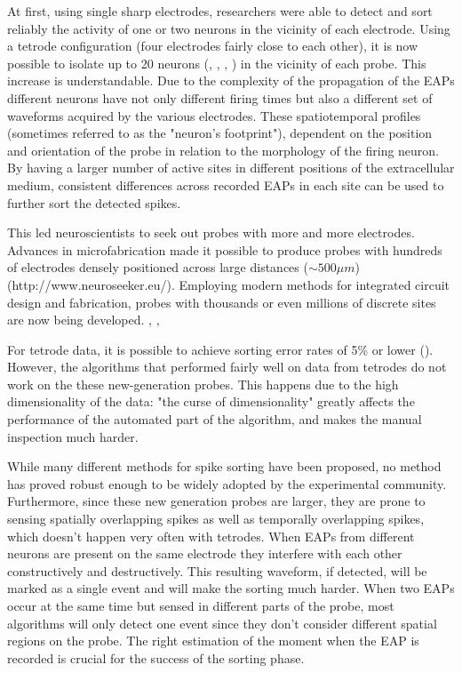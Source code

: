 At first, using single sharp electrodes, researchers were able to detect and sort reliably the activity of one or two neurons in the vicinity of each electrode. Using a tetrode configuration (four electrodes fairly close to each other), it is now possible to isolate up to 20 neurons (\cite{mcnaughton1983stereotrode}, \cite{gray1995tetrodes}, \cite{wilson1993dynamics}, \cite{recce1989tetrode}) in the vicinity of each probe. This increase is understandable. Due to the complexity of the propagation of the EAPs different neurons have not only different firing times but also a different set of waveforms acquired by the various electrodes. These spatiotemporal profiles (sometimes referred to as the "neuron's footprint"), dependent on the position and orientation of the probe in relation to the morphology of the firing neuron. By having a larger number of active sites in different positions of the extracellular medium, consistent differences across recorded EAPs in each site can be used to further sort the detected spikes. 

This led neuroscientists to seek out probes with more and more electrodes. Advances in microfabrication made it possible to produce probes with hundreds of electrodes densely positioned across large distances ($\sim 500 \mu m$) (http://www.neuroseeker.eu/). Employing modern methods for integrated circuit design and fabrication, probes with thousands or even millions of discrete sites are now being developed. \cite{dombovari2014vivo}, \cite{ruther2015new}, \cite{shobe2015brain}

For tetrode data, it is possible to achieve sorting error rates of 5\% or lower (\cite{harris2000accuracy}). However, the algorithms that performed fairly well on data from tetrodes do not work on the these new-generation probes. This happens due to the high dimensionality of the data: "the curse of dimensionality" greatly affects the performance of the automated part of the algorithm, and makes the manual inspection much harder.

While many different methods for spike sorting have been proposed, no method has proved robust enough to be widely adopted by the experimental community. Furthermore, since these new generation probes are larger, they are prone to sensing spatially overlapping spikes as well as temporally overlapping spikes, which doesn't happen very often with tetrodes. When EAPs from different neurons are present on the same electrode they interfere with each other constructively and destructively. This resulting waveform, if detected, will be marked as a single event and will make the sorting much harder. When two EAPs occur at the same time but sensed in different parts of the probe, most algorithms will only detect one event since they don't consider different spatial regions on the probe. The right estimation of the moment when the EAP is recorded is crucial for the success of the sorting phase. 

